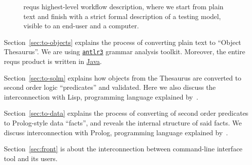 \documentclass[12pt,oneside,letterpaper]{article}
\begin{document}
    \begin{figure}[ht]
        \centering
        \caption{requs highest-level workflow description, where we start
            from plain text and finish with a strict formal description
            of a testing model, visible to an end-user and a computer.}
        \label{fig:Workflow}
    \end{figure}

    Section~\ref{sec:to-objects} explains the process of converting plain text
    to ``Object Thesaurus''. We are using
    \href{http://www.altlr.org}{\texttt{antlr3}} grammar analysis toolkit.
    Moreover, the entire requs product is written in \href{http://www.java.com/en/}{Java}.

    Section~\ref{sec:to-solm} explains how objects from the Thesaurus are converted to
    second order logic ``predicates''
    and validated. Here we also discuss the interconnection with
    Lisp, programming language explained by~\cite{graham93}.

    Section~\ref{sec:to-data} explains the process of converting of
    second order predicates to Prolog-style data ``facts'', and reveals the internal
    structure of said facts. We discuss interconnection with Prolog,
    programming language explained by~\cite{shapiro94}.

    Section~\ref{sec:front} is about the interconnection between 
    command-line interface tool and its users.
\end{document}
